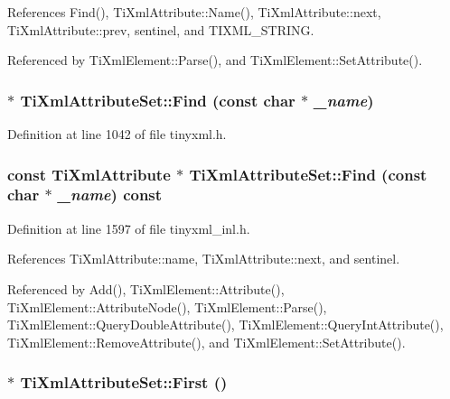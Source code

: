 References Find(), TiXmlAttribute::Name(), TiXmlAttribute::next, TiXmlAttribute::prev, sentinel, and TIXML\_\-STRING.

Referenced by TiXmlElement::Parse(), and TiXmlElement::SetAttribute().\hypertarget{class_ti_xml_attribute_set_a2f210bed54c832adf1683c44c35727b9}{
\subsubsection[{Find}]{$\ast$ TiXmlAttributeSet::Find (const char $\ast$ {\em \_\-name})}}
\label{class_ti_xml_attribute_set_a2f210bed54c832adf1683c44c35727b9}


Definition at line 1042 of file tinyxml.h.\hypertarget{class_ti_xml_attribute_set_aacbbc5e1a1c987e72815430e89fcb58b}{
\subsubsection[{Find}]{\setlength{\rightskip}{0pt plus 5cm}const {\bf TiXmlAttribute} $\ast$ TiXmlAttributeSet::Find (const char $\ast$ {\em \_\-name}) const}}
\label{class_ti_xml_attribute_set_aacbbc5e1a1c987e72815430e89fcb58b}


Definition at line 1597 of file tinyxml\_\-inl.h.

References TiXmlAttribute::name, TiXmlAttribute::next, and sentinel.

Referenced by Add(), TiXmlElement::Attribute(), TiXmlElement::AttributeNode(), TiXmlElement::Parse(), TiXmlElement::QueryDoubleAttribute(), TiXmlElement::QueryIntAttribute(), TiXmlElement::RemoveAttribute(), and TiXmlElement::SetAttribute().\hypertarget{class_ti_xml_attribute_set_a99703bb08ca2aece2d7ef835de339ba0}{
\subsubsection[{First}]{$\ast$ TiXmlAttributeSet::First ()}}
\label{class_ti_xml_attribute_set_a99703bb08ca2aece2d7ef835de339ba0}


